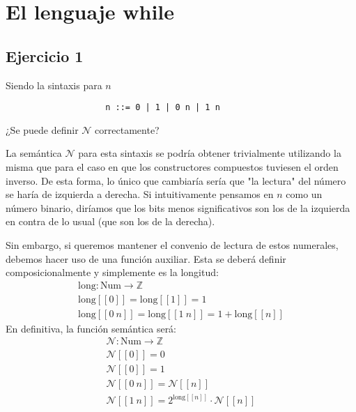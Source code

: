 \chapter{El lenguaje while}
\section{Ejercicio 1}
\begin{enun}
    Siendo la sintaxis para $n$
    \begin{lstlisting}
                    n ::= 0 | 1 | 0 n | 1 n
    \end{lstlisting} 
    ¿Se puede definir $\mathcal{N}$ correctamente?
\end{enun}
\begin{sol}
    La semántica $\mathcal{N}$ para esta sintaxis se podría obtener trivialmente
    utilizando la misma que para el caso en que los constructores compuestos
    tuviesen el orden inverso. De esta forma, lo único que cambiaría sería que
    "la lectura" del número se haría de izquierda a derecha. Si intuitivamente
    pensamos en $n$ como un número binario, diríamos que los bits menos
    significativos son los de la izquierda en contra de lo usual (que son los de
    la derecha).

    Sin embargo, si queremos mantener el convenio de lectura de estos numerales,
    debemos hacer uso de una función auxiliar. Esta se deberá definir
    composicionalmente y simplemente es la longitud:
    \begin{gather*}
        \mathrm{long}: \mathrm{Num} \rightarrow \mathbb{Z}\\
        \mathrm{long}[[0]] = \mathrm{long}[[1]] = 1\\
        \mathrm{long}[[0\ n]] = \mathrm{long}[[1\ n]] = 1 + \mathrm{long}[[n]]
    \end{gather*}
    En definitiva, la función semántica será:
    \begin{gather*}
        \mathcal{N}: \mathrm{Num} \rightarrow \mathbb{Z}\\
        \mathcal{N}[[0]] = 0\\
        \mathcal{N}[[0]] = 1\\
        \mathcal{N}[[0\ n]] = \mathcal{N}[[n]]\\
        \mathcal{N}[[1\ n]] = 2^{\mathrm{long}[[n]]} \cdot \mathcal{N}[[n]]
    \end{gather*}
\end{sol}

